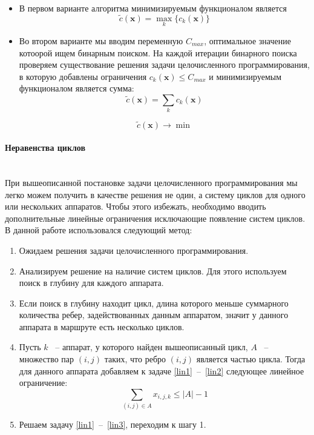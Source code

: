 \documentclass[a4paper,14pt,russian]{article}
\begin{document}

\begin{itemize}
\item В первом варианте алгоритма минимизируемым функционалом является
\begin{equation}
\widetilde{c}(\mathbf{x}) = \displaystyle\max_k \{c_k(\mathbf{x})\}
\end{equation}

\item Во втором варианте мы вводим переменную $C_{max}$, оптимальное значение котоорой ищем бинарным поиском. На каждой итерации бинарного поиска проверяем существование решения задачи целочисленного программирования, в которую добавлены ограничения $c_k(\mathbf{x}) \le C_{max}$ и минимизируемым функционалом является сумма:
\begin{equation}
\widetilde{c}(\mathbf{x}) = \displaystyle\sum_k c_k(\mathbf{x})
\end{equation}

\begin{equation} \label{lin2}
\widetilde{c}(\mathbf{x}) \rightarrow \min
\end{equation}

\end{itemize}


\paragraph{Неравенства циклов} ~\\

При вышеописанной постановке задачи целочисленного программирования мы легко можем получить в качестве решения не один, а систему циклов для одного или нескольких аппаратов. Чтобы этого избежать, необходимо вводить дополнительные линейные ограничения исключающие появление систем циклов. В данной работе использовался следующий метод:
\begin{enumerate}
\item  Ожидаем решения задачи целочисленного программирования.
\item Анализируем решение на наличие систем циклов. Для этого используем поиск в глубину для каждого аппарата.
\item Если поиск в глубину находит цикл, длина которого меньше суммарного количества ребер, задействованных данным аппаратом, значит у данного аппарата в маршруте есть несколько циклов.
\item Пусть $k$ ~-- аппарат, у которого найден вышеописанный цикл, $A$ ~-- множество пар $(i, j)$ таких, что ребро $(i, j)$ является частью цикла. Тогда для данного аппарата добавляем к задаче \eqref{lin1}~--~\eqref{lin2} следующее линейное ограничение:
\begin{equation} \label{lin3}
\displaystyle \sum_{(i,j) \in A} x_{i,j,k} \le |A| - 1
\end{equation}

\item Решаем задачу \eqref{lin1}~--~\eqref{lin3}, переходим к шагу 1.
\end{enumerate}
\end{document}
